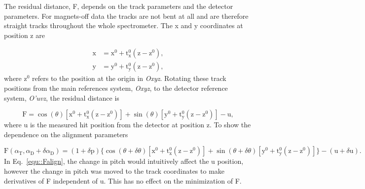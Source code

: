 The residual distance, F, depends on the track parameters and the detector
parameters.  For magnets-off data the tracks are not bent at all and are
therefore straight tracks throughout the whole spectrometer.  The x and y
coordinates at position z are

\begin{align}
  \label{equ::trackPosOff}
  \mathrm{x} &= \mathrm{x}^0 +
  \mathrm{t}_{\mathrm{x}}^0(\mathrm{z}-\mathrm{z}^0), \\
  \mathrm{y} &=
  \mathrm{y}^0 + \mathrm{t}_{\mathrm{y}}^0(\mathrm{z}-\mathrm{z}^0),
\end{align}
\noindent
where z$^0$ refers to the position at the origin in \textit{Oxyz}.
Rotating these track positions from the main references system, \textit{Oxyz},
to the detector reference system, \textit{O'uvz}, the residual distance is

\begin{equation}
\mathrm{F} = \cos(\theta)[\mathrm{x}^0 +
  \mathrm{t}_{\mathrm{x}}^0(\mathrm{z}-\mathrm{z}^0)] +
\sin(\theta)[\mathrm{y}^0 + \mathrm{t}_{\mathrm{y}}^0(\mathrm{z}-\mathrm{z}^0)]
- \mathrm{u},
\end{equation}
\noindent
where u is the measured hit position from the detector at position z.  To show
the dependence on the alignment parameters

\begin{dmath} \label{equ::Falign}
  \mathrm{F}(\alpha_{\mathrm{T}}, \alpha_{\mathrm{D}}+\delta\alpha_{\mathrm{D}})
  = (1+\delta \mathrm{p})
  \Big \{ \cos(\theta + \delta \theta)
       [\mathrm{x}^0 + \mathrm{t}^0_{\mathrm{x}}(\mathrm{z}-\mathrm{z}^0)] +
       \sin(\theta + \delta \theta)[\mathrm{y}^0 + \mathrm{t}^0_{\mathrm{y}}
         (\mathrm{z}-\mathrm{z}^0)] \Big \} -
       (\mathrm{u} + \delta \mathrm{u}).
\end{dmath}
\noindent
In Eq.~\ref{equ::Falign}, the change in pitch would intuitively affect the u
position, however the change in pitch was moved to the track coordinates to make
derivatives of F independent of u.  This has no effect on the minimization of F.

